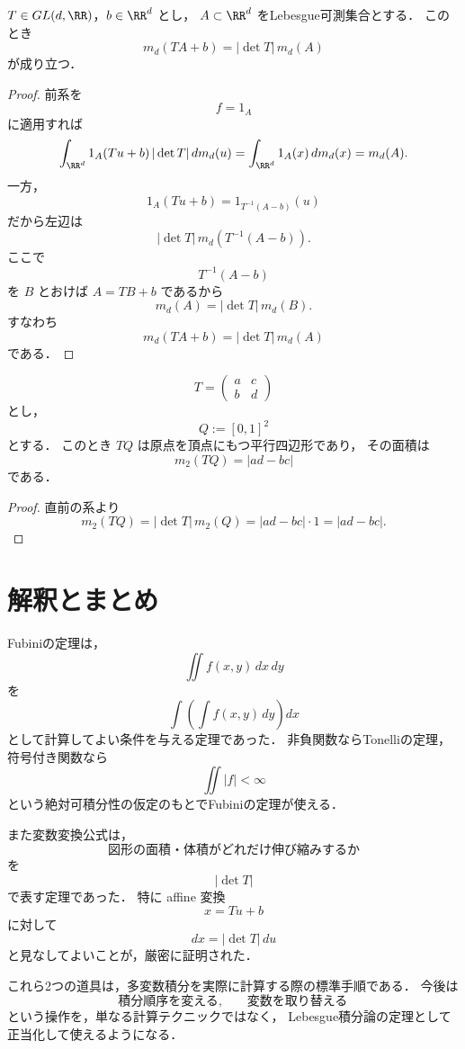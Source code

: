 \begin{corollary}[集合の体積の変換]
$T\in GL(d,\RR)$，$b\in\RR^d$ とし，
$A\subset\RR^d$ をLebesgue可測集合とする．
このとき
\[
m_d(TA+b)=|\det T|\,m_d(A)
\]
が成り立つ．
\end{corollary}
\begin{proof}
前系を
\[
f=1_A
\]
に適用すれば
\[
\int_{\RR^d}1_A(Tu+b)\,|\det T|\,dm_d(u)
=
\int_{\RR^d}1_A(x)\,dm_d(x)
=
m_d(A).
\]
一方，
\[
1_A(Tu+b)=1_{T^{-1}(A-b)}(u)
\]
だから左辺は
\[
|\det T|\,m_d(T^{-1}(A-b)).
\]
ここで
\[
T^{-1}(A-b)
\]
を $B$ とおけば $A=TB+b$ であるから
\[
m_d(A)=|\det T|\,m_d(B).
\]
すなわち
\[
m_d(TA+b)=|\det T|\,m_d(A)
\]
である．
\end{proof}

\begin{example}[平行四辺形の面積]
\[
T=
\begin{pmatrix}
a & c\\
b & d
\end{pmatrix}
\]
とし，
\[
Q:=[0,1]^2
\]
とする．
このとき $TQ$ は原点を頂点にもつ平行四辺形であり，
その面積は
\[
m_2(TQ)=|ad-bc|
\]
である．
\end{example}
\begin{proof}
直前の系より
\[
m_2(TQ)=|\det T|\,m_2(Q)=|ad-bc|\cdot 1=|ad-bc|.
\]
\end{proof}

\section{解釈とまとめ}

Fubiniの定理は，
\[
\iint f(x,y)\,dx\,dy
\]
を
\[
\int\left(\int f(x,y)\,dy\right)dx
\]
として計算してよい条件を与える定理であった．
非負関数ならTonelliの定理，
符号付き関数なら
\[
\iint |f|<\infty
\]
という絶対可積分性の仮定のもとでFubiniの定理が使える．

また変数変換公式は，
\[
\text{図形の面積・体積がどれだけ伸び縮みするか}
\]
を
\[
|\det T|
\]
で表す定理であった．
特に affine 変換
\[
x=Tu+b
\]
に対して
\[
dx=|\det T|\,du
\]
と見なしてよいことが，厳密に証明された．

これら2つの道具は，多変数積分を実際に計算する際の標準手順である．
今後は
\[
\text{積分順序を変える},\qquad \text{変数を取り替える}
\]
という操作を，単なる計算テクニックではなく，
Lebesgue積分論の定理として正当化して使えるようになる．
